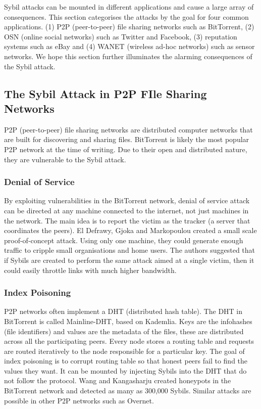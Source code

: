 
Sybil attacks can be mounted in different applications and cause a large array
of consequences. This section categorises the attacks by the goal for four
common applications. (1) P2P (peer-to-peer) file sharing networks such as
BitTorrent, (2) OSN (online social networks) such as Twitter and Facebook, (3)
reputation systems such as eBay and (4) WANET (wireless ad-hoc networks) such as
sensor networks. We hope this section further illuminates the alarming
consequences of the Sybil attack.

\subsection{The Sybil Attack in P2P FIle Sharing Networks}
P2P (peer-to-peer) file sharing networks are distributed computer networks that
are built for discovering and sharing files. BitTorrent\cite{bep3} is likely the
most popular P2P network at the time of writing. Due to their open and
distributed nature, they are vulnerable to the Sybil attack.

\subsubsection{Denial of Service}
By exploiting vulnerabilities in the BitTorrent network, denial of service
attack can be directed at any machine connected to the internet, not just
machines in the network\cite{sia2006ddos}. The main idea is to report the victim
as the tracker (a server that coordinates the peers). El Defrawy, Gjoka and
Markopoulou created a small scale proof-of-concept attack. Using only one
machine, they could generate enough traffic to cripple small organisations and
home users. The authors suggested that if Sybils are created to perform the same
attack aimed at a single victim, then it could easily throttle links with much
higher bandwidth\cite{el2007bottorrent}.


\subsubsection{Index Poisoning}
P2P networks often implement a DHT (distributed hash table). The DHT in
BitTorrent is called Mainline-DHT, based on
Kademlia\cite{maymounkov2002kademlia}. Keys are the infohashes (file
identifiers) and values are the metadata of the files, these are distributed
across all the participating peers. Every node stores a routing table and
requests are routed iteratively to the node responsible for a particular
key\cite{bep5}. The goal of index poisoning is to corrupt routing table so that
honest peers fail to find the values they want. It can be mounted by injecting
Sybils into the DHT that do not follow the protocol. Wang and Kangasharju
created honeypots in the BitTorrent network and detected as many as 300,000
Sybils\cite{wang2012real}. Similar attacks are possible in other P2P networks
such as Overnet\cite{liang2006index}.

